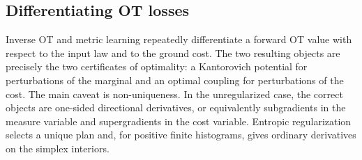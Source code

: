 \subsection{Differentiating OT losses}

Inverse OT and metric learning repeatedly differentiate a forward OT value with respect to the input law and to the ground cost. The two resulting objects are precisely the two certificates of optimality: a Kantorovich potential for perturbations of the marginal and an optimal coupling for perturbations of the cost. The main caveat is non-uniqueness. In the unregularized case, the correct objects are one-sided directional derivatives, or equivalently subgradients in the measure variable and supergradients in the cost variable. Entropic regularization selects a unique plan and, for positive finite histograms, gives ordinary derivatives on the simplex interiors.

